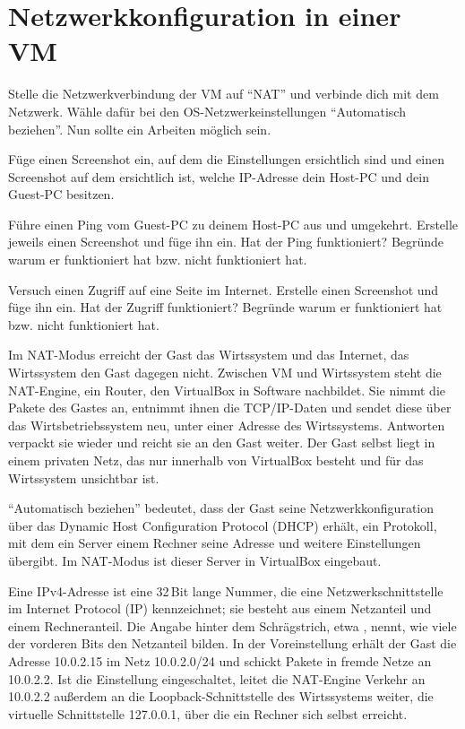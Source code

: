 \chapter{Netzwerkkonfiguration in einer VM}
\label{kap:netzwerk}

\begin{aufgabe}
Stelle die Netzwerkverbindung der VM auf \enquote{NAT} und verbinde dich mit dem Netzwerk. Wähle dafür bei den OS-Netzwerkeinstellungen \enquote{Automatisch beziehen}. Nun sollte ein Arbeiten möglich sein.

Füge einen Screenshot ein, auf dem die Einstellungen ersichtlich sind und einen Screenshot auf dem ersichtlich ist, welche IP-Adresse dein Host-PC und dein Guest-PC besitzen.

Führe einen Ping vom Guest-PC zu deinem Host-PC aus und umgekehrt. Erstelle jeweils einen Screenshot und füge ihn ein. Hat der Ping funktioniert? Begründe warum er funktioniert hat bzw. nicht funktioniert hat.

Versuch einen Zugriff auf eine Seite im Internet. Erstelle einen Screenshot und füge ihn ein. Hat der Zugriff funktioniert? Begründe warum er funktioniert hat bzw. nicht funktioniert hat.
\end{aufgabe}
\label{sec:nat-konfig}

Im NAT-Modus erreicht der Gast das Wirtssystem und das Internet, das Wirtssystem den Gast dagegen nicht. Zwischen VM und Wirtssystem steht die NAT-Engine, ein Router, den VirtualBox in Software nachbildet. Sie nimmt die Pakete des Gastes an, entnimmt ihnen die TCP/IP-Daten und sendet diese über das Wirtsbetriebssystem neu, unter einer Adresse des Wirtssystems. Antworten verpackt sie wieder und reicht sie an den Gast weiter. Der Gast selbst liegt in einem privaten Netz, das nur innerhalb von VirtualBox besteht und für das Wirtssystem unsichtbar ist.

\enquote{Automatisch beziehen} bedeutet, dass der Gast seine Netzwerkkonfiguration über das Dynamic Host Configuration Protocol (DHCP) erhält, ein Protokoll, mit dem ein Server einem Rechner seine Adresse und weitere Einstellungen übergibt. Im NAT-Modus ist dieser Server in VirtualBox eingebaut.

Eine IPv4-Adresse ist eine 32\,Bit lange Nummer, die eine Netzwerkschnittstelle im Internet Protocol (IP) kennzeichnet; sie besteht aus einem Netzanteil und einem Rechneranteil. Die Angabe hinter dem Schrägstrich, etwa , nennt, wie viele der vorderen Bits den Netzanteil bilden. In der Voreinstellung erhält der Gast die Adresse 10.0.2.15 im Netz 10.0.2.0/24 und schickt Pakete in fremde Netze an 10.0.2.2. Ist die Einstellung  eingeschaltet, leitet die NAT-Engine Verkehr an 10.0.2.2 außerdem an die Loopback-Schnittstelle des Wirtssystems weiter, die virtuelle Schnittstelle 127.0.0.1, über die ein Rechner sich selbst erreicht.

